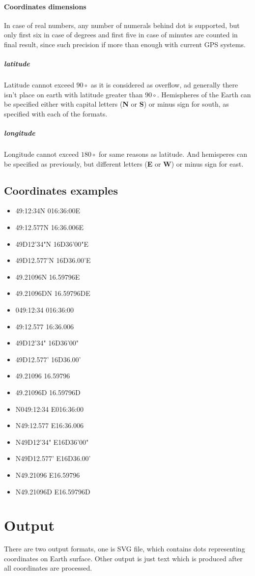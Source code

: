 \documentclass[12pt,titlepage]{article}
\begin{document}
\paragraph{Coordinates dimensions}
In case of real numbers, any number of numerals behind 
dot is supported, but only first six in case of degrees and first five in case of minutes are
counted in final result, since such precision if more than enough with current GPS systems. 

\subparagraph{latitude}
Latitude cannot exceed $90\circ$ as it is considered as overflow, ad generally there isn't place 
on earth with latitude greater than $90\circ$. Hemispheres of the Earth can be specified either with capital letters (\textbf{N} or \textbf{S}) or minus sign for south, as specified with each of the formats.
\subparagraph{longitude}
Longitude cannot exceed $180\circ$ for same reasons as latitude. And hemisperes can be specified 
as previously, but different letters (\textbf{E} or \textbf{W}) or minus sign for east. 

\subsection{Coordinates examples}
\begin{itemize}
\item{49:12:34N 016:36:00E }
\item{49:12.577N 16:36.006E}
\item{49D12'34"N 16D36'00"E}
\item{49D12.577'N 16D36.00'E}
\item{49.21096N 16.59796E}
\item{49.21096DN 16.59796DE}
 
\item{049:12:34 016:36:00 }
\item{49:12.577 16:36.006}
\item{49D12'34" 16D36'00"}
\item{49D12.577' 16D36.00'}
\item{49.21096 16.59796}
\item{49.21096D 16.59796D}

\item{N049:12:34 E016:36:00 }
\item{N49:12.577 E16:36.006}
\item{N49D12'34" E16D36'00"}
\item{N49D12.577' E16D36.00'}
\item{N49.21096 E16.59796}
\item{N49.21096D E16.59796D}
\end{itemize}

\section{Output}
There are two output formats, one is SVG file, which contains dots representing coordinates on Earth surface. Other output is just text which is produced after all coordinates are processed.
\end{document}
